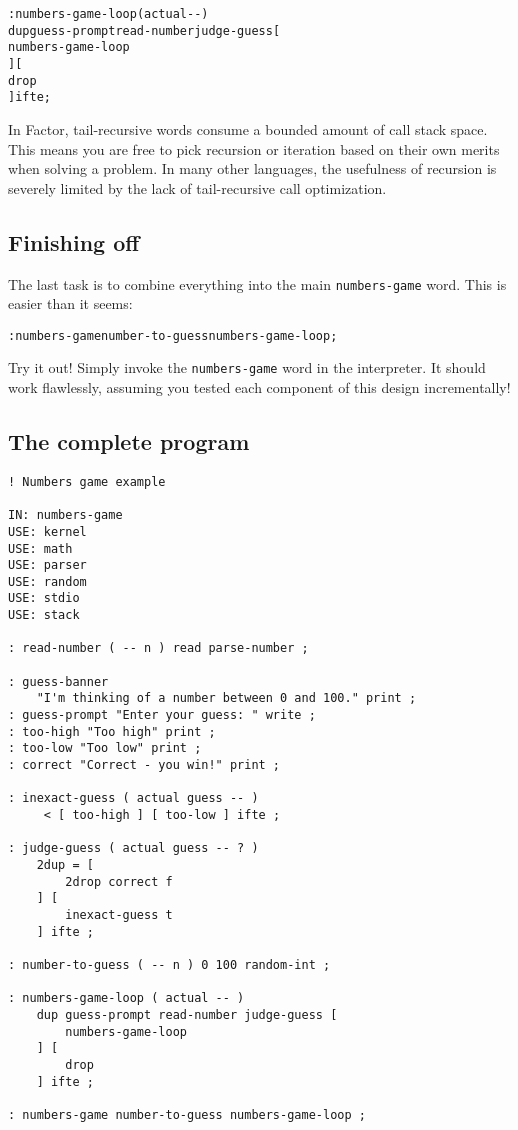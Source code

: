 \documentclass[english]{article}
\begin{document}
\begin{alltt}
: numbers-game-loop ( actual -{}- )
    dup guess-prompt read-number judge-guess {[}
        numbers-game-loop
    {]} {[}
        drop
    {]} ifte ;
\end{alltt}
In Factor, tail-recursive words consume a bounded amount of call stack
space. This means you are free to pick recursion or iteration based
on their own merits when solving a problem. In many other languages,
the usefulness of recursion is severely limited by the lack of tail-recursive
call optimization.


\subsection{Finishing off}

The last task is to combine everything into the main \texttt{numbers-game}
word. This is easier than it seems:

\begin{alltt}
: numbers-game number-to-guess numbers-game-loop ;
\end{alltt}
Try it out! Simply invoke the \texttt{numbers-game} word in the interpreter.
It should work flawlessly, assuming you tested each component of this
design incrementally!


\subsection{The complete program}

\begin{verbatim}
! Numbers game example

IN: numbers-game
USE: kernel
USE: math
USE: parser
USE: random
USE: stdio
USE: stack

: read-number ( -- n ) read parse-number ;

: guess-banner
    "I'm thinking of a number between 0 and 100." print ;
: guess-prompt "Enter your guess: " write ;
: too-high "Too high" print ;
: too-low "Too low" print ;
: correct "Correct - you win!" print ;

: inexact-guess ( actual guess -- )
     < [ too-high ] [ too-low ] ifte ;

: judge-guess ( actual guess -- ? )
    2dup = [
        2drop correct f
    ] [
        inexact-guess t
    ] ifte ;

: number-to-guess ( -- n ) 0 100 random-int ;

: numbers-game-loop ( actual -- )
    dup guess-prompt read-number judge-guess [
        numbers-game-loop
    ] [
        drop
    ] ifte ;

: numbers-game number-to-guess numbers-game-loop ;
\end{verbatim}
\end{document}

